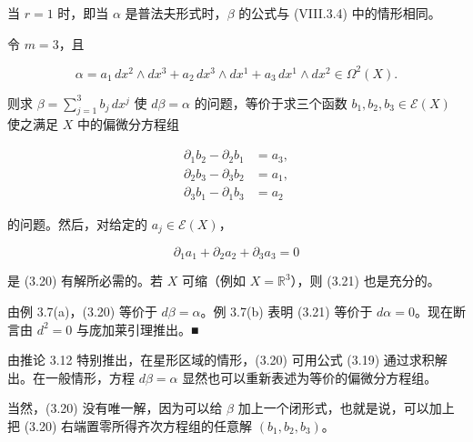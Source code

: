 \begin{remark}

\begin{items}
\item

当 $ r = 1 $ 时，即当 $ \alpha $ 是普法夫形式时，$ \beta $ 的公式与 (VIII.3.4) 中的情形相同。

\item

令 $ m = 3 $，且

\[
\alpha = a_{1}\, dx^{2} \wedge dx^{3} + a_{2}\, dx^{3} \wedge dx^{1} + a_{3}\, dx^{1} \wedge dx^{2} \in \Omega^{2}(X).
\]

则求 $ \beta = \sum_{j=1}^{3} b_{j}\, dx^{j} $ 使 $ d\beta = \alpha $ 的问题，等价于求三个函数 $ b_{1}, b_{2}, b_{3} \in \mathcal{E}(X) $ 使之满足 $ X $ 中的偏微分方程组

\begin{equation}
\begin{aligned}
\partial_{1} b_{2} - \partial_{2} b_{1} &= a_{3}, \\ \partial_{2} b_{3} - \partial_{3} b_{2} &= a_{1}, \\ \partial_{3} b_{1} - \partial_{1} b_{3} &= a_{2}
\end{aligned}\tag{3.20}
\end{equation}

的问题。然后，对给定的 $ a_{j} \in \mathcal{E}(X) $，

\begin{equation}
\partial_{1} a_{1} + \partial_{2} a_{2} + \partial_{3} a_{3} = 0\tag{3.21}
\end{equation}

是 (3.20) 有解所必需的。若 $ X $ 可缩（例如 $ X = \mathbb{R}^{3} $），则 (3.21) 也是充分的。

\proofhead
由例 3.7(a)，(3.20) 等价于 $ d\beta = \alpha $。例 3.7(b) 表明 (3.21) 等价于 $ d\alpha = 0 $。现在断言由 $ d^{2} = 0 $ 与庞加莱引理推出。\nobreak\hspace{0.35em}■
\end{items}

由推论 3.12 特别推出，在星形区域的情形，(3.20) 可用公式 (3.19) 通过求积解出。在一般情形，方程 $ d\beta = \alpha $ 显然也可以重新表述为等价的偏微分方程组。

当然，(3.20) 没有唯一解，因为可以给 $ \beta $ 加上一个闭形式，也就是说，可以加上把 (3.20) 右端置零所得齐次方程组的任意解 $ (b_{1}, b_{2}, b_{3}) $。

\end{remark}

